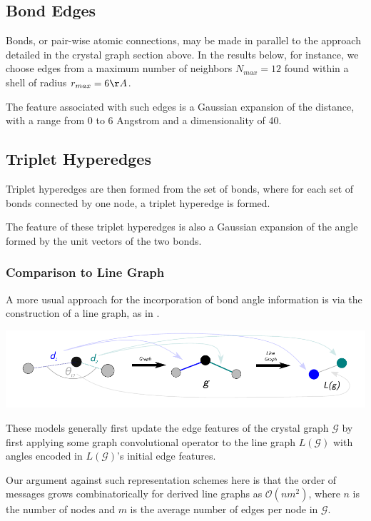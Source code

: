 \documentclass[10pt,a4paper]{article}
\begin{document}
\subsection{Bond Edges}
Bonds, or pair-wise atomic connections, may be made in parallel to the approach detailed in the crystal graph section above. In the results below, for instance, we choose edges from a maximum number of neighbors $N_{max}=12$ found within a shell of radius $r_{max}=6\AA$. 

The feature associated with such edges is a Gaussian expansion of the distance, with a range from 0 to 6 Angstrom and a dimensionality of 40.

\subsection{Triplet Hyperedges}
Triplet hyperedges are then formed from the set of bonds, where for each set of bonds connected by one node, a triplet hyperedge is formed.

The feature of these triplet hyperedges is also a Gaussian expansion of the angle formed by the unit vectors of the two bonds.

\subsubsection{Comparison to Line Graph}
A more usual approach for the incorporation of bond angle information is via the construction of a line graph, as in \cite{alignn, m3gnet}. 
\begin{center}
\includegraphics[scale=0.7]{line_graph_ex.pdf}
\end{center}
These models generally first update the edge features of the crystal graph $\mathcal{G}$ by first applying some graph convolutional operator to the line graph $L(\mathcal{G})$ with angles encoded in  $L(\mathcal{G})$'s initial edge features.

Our argument against such representation schemes here is that the order of messages grows combinatorically for derived line graphs as $\mathcal{O}(nm^2)$, where $n$ is the number of nodes and $m$ is the average number of edges per node in $\mathcal{G}$.
\end{document}
